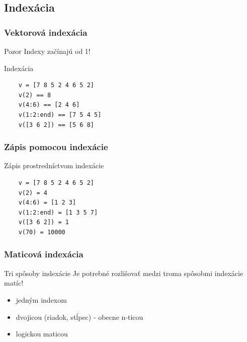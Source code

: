 \documentclass{beamer}
\begin{document}
\subsection{Indexácia}

\begin{frame}[fragile]
\frametitle{Vektorová indexácia}
  \begin{alertblock}{Pozor}
    Indexy začínajú od 1!
  \end{alertblock}  
    
  \begin{block}{Indexácia}
  \begin{verbatim}
    v = [7 8 5 2 4 6 5 2]
    v(2) == 8
    v(4:6) == [2 4 6]
    v(1:2:end) == [7 5 4 5]
    v([3 6 2]) == [5 6 8]\end{verbatim}
  \end{block}
  
\end{frame}

\begin{frame}[fragile]
\frametitle{Zápis pomocou indexácie}

  \begin{block}{Zápis prostredníctvom indexácie}
  \begin{verbatim}
    v = [7 8 5 2 4 6 5 2]
    v(2) = 4
    v(4:6) = [1 2 3]
    v(1:2:end) = [1 3 5 7]
    v([3 6 2]) = 1
    v(70) = 10000\end{verbatim}
  \end{block}
  
  \pause
  
\end{frame}

\begin{frame}
\frametitle{Maticová indexácia}
  \begin{alertblock}{Tri spôsoby indexácie}
    Je potrebné rozlišovať medzi troma spôsobmi indexácie matíc!
    \begin{itemize}
      \item jedným indexom
      \item dvojicou (riadok, stĺpec) - obecne n-ticou
      \item logickou maticou
    \end{itemize}
  \end{alertblock}
\end{frame}
\end{document}
